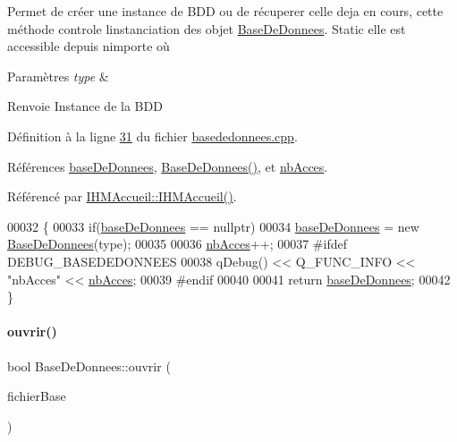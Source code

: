 Permet de créer une instance de B\+DD ou de récuperer celle deja en cours, cette méthode controle l\textquotesingle{}instanciation des objet \hyperlink{class_base_de_donnees}{Base\+De\+Donnees}. Static elle est accessible depuis n\textquotesingle{}importe où 


\begin{DoxyParams}{Paramètres}
{\em type} & \\
\hline
\end{DoxyParams}
\begin{DoxyReturn}{Renvoie}
Instance de la B\+DD 
\end{DoxyReturn}


Définition à la ligne \hyperlink{basededonnees_8cpp_source_l00031}{31} du fichier \hyperlink{basededonnees_8cpp_source}{basededonnees.\+cpp}.



Références \hyperlink{basededonnees_8h_source_l00027}{base\+De\+Donnees}, \hyperlink{basededonnees_8cpp_source_l00015}{Base\+De\+Donnees()}, et \hyperlink{basededonnees_8h_source_l00029}{nb\+Acces}.



Référencé par \hyperlink{ihmaccueil_8cpp_source_l00014}{I\+H\+M\+Accueil\+::\+I\+H\+M\+Accueil()}.


\begin{DoxyCode}
00032 \{
00033     \textcolor{keywordflow}{if}(\hyperlink{class_base_de_donnees_a822ba0b7cf85b1e48ced8efd3d65e266}{baseDeDonnees} == \textcolor{keyword}{nullptr})
00034         \hyperlink{class_base_de_donnees_a822ba0b7cf85b1e48ced8efd3d65e266}{baseDeDonnees} = \textcolor{keyword}{new} \hyperlink{class_base_de_donnees_a10dd177f1008f675ab78c2221b2a6750}{BaseDeDonnees}(type);
00035 
00036     \hyperlink{class_base_de_donnees_a5099ecb2922bb31d84cd5d4505298a29}{nbAcces}++;
00037 \textcolor{preprocessor}{    #ifdef DEBUG\_BASEDEDONNEES}
00038     qDebug() << Q\_FUNC\_INFO << \textcolor{stringliteral}{"nbAcces"} << \hyperlink{class_base_de_donnees_a5099ecb2922bb31d84cd5d4505298a29}{nbAcces};
00039 \textcolor{preprocessor}{    #endif}
00040 
00041     \textcolor{keywordflow}{return} \hyperlink{class_base_de_donnees_a822ba0b7cf85b1e48ced8efd3d65e266}{baseDeDonnees};
00042 \}
\end{DoxyCode}
\mbox{\label{class_base_de_donnees_a7f6a5510b08017b0d99115a84252f186}} 
\paragraph{\texorpdfstring{ouvrir()}{ouvrir()}}
{\footnotesize\ttfamily bool Base\+De\+Donnees\+::ouvrir (\begin{DoxyParamCaption}\item[{Q\+String}]{fichier\+Base }\end{DoxyParamCaption})}



